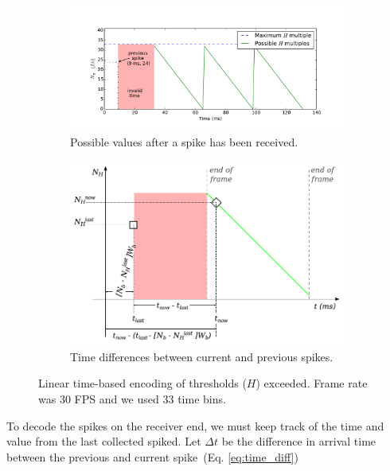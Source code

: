 \documentclass[twocolumn, a4paper]{article}
\begin{document}
\begin{figure}[htb]
  \centering
      
    \begin{subfigure}[b]{0.35\textwidth}
      \includegraphics[width=\textwidth]{spike_values_linear}
      \caption{Possible values after a spike has been received.}
      \label{fig:linear_time_all}
    \end{subfigure}
    
    \begin{subfigure}[b]{0.35\textwidth}
      \includegraphics[width=\textwidth]{new_val_calc_linear}
      \caption{Time differences between current and previous spikes.}
      \label{fig:linear_time_calc}
    \end{subfigure}
  \caption{Linear time-based encoding of thresholds ($H$) exceeded.  Frame rate was 30 FPS and we used 33 time bins.}
  \label{fig:linear_time}
\end{figure} 

To decode the spikes on the receiver end, we must keep track of the time and value from the last collected spiked. Let $\Delta t$ be the difference in arrival time between the previous and current spike~(Eq. \ref{eq:time_diff})
\end{document}
